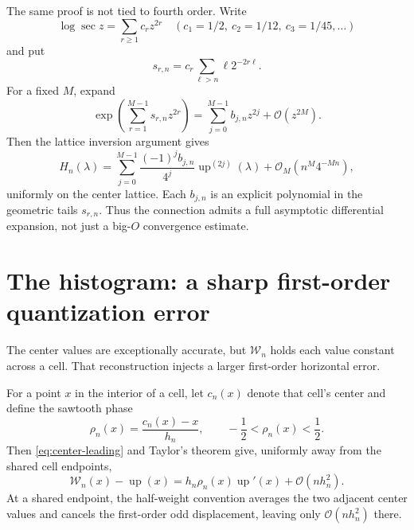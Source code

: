 \documentclass[11pt,oneside]{article}
\theoremstyle{definition}
\theoremstyle{remark}
\newcommand{\Up}{\operatorname{up}}
\newcommand{\bigO}{\mathcal O}
\begin{document}
The same proof is not tied to fourth order.  Write
\begin{equation}
 \log\sec z=\sum_{r\ge1}c_rz^{2r}
 \quad(c_1=1/2,\ c_2=1/12,\ c_3=1/45,\ldots)              \label{eq:logsec-full}
\end{equation}
and put
\begin{equation}
 s_{r,n}=c_r\sum_{\ell>n}\ell2^{-2r\ell}.                 \label{eq:srn}
\end{equation}
For a fixed $M$, expand
\begin{equation}
 \exp\left(\sum_{r=1}^{M-1}s_{r,n}z^{2r}\right)
 =\sum_{j=0}^{M-1}b_{j,n}z^{2j}+\bigO(z^{2M}).             \label{eq:bjn}
\end{equation}
Then the lattice inversion argument gives
\begin{equation}
 H_n(\lambda)
 =\sum_{j=0}^{M-1}\frac{(-1)^j b_{j,n}}{4^j}
    \Up^{(2j)}(\lambda)
 +\bigO_M\!\left(n^M4^{-Mn}\right),                      \label{eq:all-orders}
\end{equation}
uniformly on the center lattice.  Each $b_{j,n}$ is an explicit polynomial in the geometric
tails $s_{r,n}$.  Thus the connection admits a full asymptotic differential expansion, not
just a big-$O$ convergence estimate.

\section{The histogram: a sharp first-order quantization error}
\label{sec:histogram-rate}

The center values are exceptionally accurate, but $\mathcal W_n$ holds each value constant
across a cell.  That reconstruction injects a larger first-order horizontal error.

For a point $x$ in the interior of a cell, let $c_n(x)$ denote that cell's center and define
the sawtooth phase
\begin{equation}
 \rho_n(x)=\frac{c_n(x)-x}{h_n},
 \qquad -\frac12<\rho_n(x)<\frac12.                       \label{eq:rho}
\end{equation}
Then \eqref{eq:center-leading} and Taylor's theorem give, uniformly away from the shared cell
endpoints,
\begin{equation}
 \mathcal W_n(x)-\Up(x)
 =h_n\rho_n(x)\Up'(x)+\bigO(nh_n^2).                      \label{eq:hist-local}
\end{equation}
At a shared endpoint, the half-weight convention averages the two adjacent center values and
cancels the first-order odd displacement, leaving only $\bigO(nh_n^2)$ there.
\end{document}
